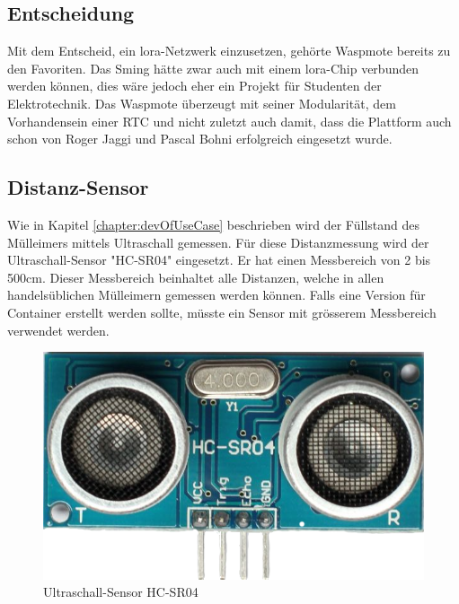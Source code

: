 \subsection*{Entscheidung}
Mit dem Entscheid, ein \gls{lora}-Netzwerk einzusetzen, gehörte Waspmote bereits zu den Favoriten. Das Sming hätte zwar auch mit einem \gls{lora}-Chip verbunden werden können, dies wäre jedoch eher ein Projekt für Studenten der Elektrotechnik. Das Waspmote überzeugt mit seiner Modularität, dem Vorhandensein einer RTC und nicht zuletzt auch damit, dass die Plattform auch schon von Roger Jaggi und Pascal Bohni erfolgreich eingesetzt wurde.

\subsection{Distanz-Sensor}
Wie in Kapitel \ref{chapter:devOfUseCase} beschrieben wird der Füllstand des Mülleimers mittels Ultraschall gemessen. Für diese Distanzmessung wird der Ultraschall-Sensor "HC-SR04" eingesetzt. Er hat einen Messbereich von 2 bis 500cm. Dieser Messbereich beinhaltet alle Distanzen, welche in allen handelsüblichen Mülleimern gemessen werden können. Falls eine Version für Container erstellt werden sollte, müsste ein Sensor mit grösserem Messbereich verwendet werden. 
\begin{figure}[H]
     \centering
        \includegraphics[scale=0.3]{pictures/HC-SR04.png}
    \caption{Ultraschall-Sensor HC-SR04}
    \label{fig:HCSR04}
\end{figure}

